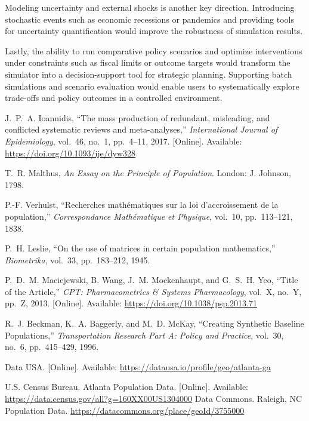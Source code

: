 \documentclass[12pt]{article}
\begin{document}
Modeling uncertainty and external shocks is another key direction. Introducing stochastic events such as economic recessions or pandemics and providing tools for uncertainty quantification would improve the robustness of simulation results.

Lastly, the ability to run comparative policy scenarios and optimize interventions under constraints such as fiscal limits or outcome targets would transform the simulator into a decision-support tool for strategic planning. Supporting batch simulations and scenario evaluation would enable users to systematically explore trade-offs and policy outcomes in a controlled environment.


\newpage
\begin{thebibliography}{20}

J.~P.~A. Ioannidis, ``The mass production of redundant, misleading, and conflicted systematic reviews and meta-analyses,'' \emph{International Journal of Epidemiology}, vol.~46, no.~1, pp.~4--11, 2017. [Online]. Available: \url{https://doi.org/10.1093/ije/dyw328}

T.~R. Malthus, \emph{An Essay on the Principle of Population}. London: J. Johnson, 1798.

P.-F. Verhulst, ``Recherches mathématiques sur la loi d'accroissement de la population,'' \emph{Correspondance Mathématique et Physique}, vol.~10, pp.~113--121, 1838.

P.~H. Leslie, ``On the use of matrices in certain population mathematics,'' \emph{Biometrika}, vol.~33, pp.~183--212, 1945.

P.~D.~M. Maciejewski, B. Wang, J.~M. Mockenhaupt, and G.~S.~H. Yeo, ``Title of the Article,'' \emph{CPT: Pharmacometrics \& Systems Pharmacology}, vol.~X, no.~Y, pp.~Z, 2013. [Online]. Available: \url{https://doi.org/10.1038/psp.2013.71}

R.~J. Beckman, K.~A. Baggerly, and M.~D. McKay, ``Creating Synthetic Baseline Populations,'' \emph{Transportation Research Part A: Policy and Practice}, vol.~30, no.~6, pp.~415--429, 1996.

Data USA. [Online]. Available: \url{https://datausa.io/profile/geo/atlanta-ga}

U.S. Census Bureau. Atlanta Population Data. [Online]. Available: \url{https://data.census.gov/all?g=160XX00US1304000}
Data Commons. Raleigh, NC Population Data. \url{https://datacommons.org/place/geoId/3755000}


\end{thebibliography}
\end{document}
